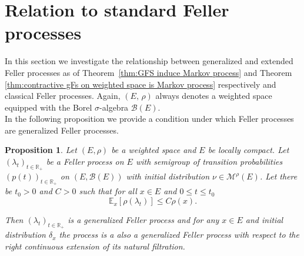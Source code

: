 \documentclass[a4paper,12pt]{article}
\newtheorem{proposition}[theorem]{Proposition}
\theoremstyle{definition}
\theoremstyle{remark}
\numberwithin{equation}{section}
\numberwithin{theorem}{section}
\begin{document}
\section{Relation to standard Feller processes}\label{sec:relation}

 In this section we investigate the relationship between generalized and extended Feller processes as of
Theorem~\ref{thm:GFS induce Markov process} and Theorem \ref{thm:contractive gFs on weighted space is Markov process} respectively and
classical Feller processes. Again, $\left(E,\,\rho\right)$ always denotes a weighted
space equipped with the Borel $\sigma$-algebra $\mathcal{B}(E)$. \\

In the following proposition we provide a condition under which Feller processes are generalized Feller processes. 
\begin{proposition}
\label{prop:Generalized Feller sometimes Feller process on locally compact space}
Let $\left(E,\rho\right)$ be a weighted space and $E$ be locally
compact. Let $\left(\lambda_{t}\right)_{t\in\mathbb{R}_{+}}$ be a
Feller process on $E$ with semigroup of transition probabilities
$\left(p(t)\right)_{t\in\mathbb{R}_{+}}$ on $\left(E,\mathcal{B}(E)\right)$
with initial distribution $\nu\in\mathcal{M}^{\rho}(E)$. Let there
be $t_{0}>0$ and $C>0$ such that for all $x\in E$ and $0\leq t\leq t_{0}$
\[
\mathbb{E}_{x}\left[\rho(\lambda_{t})\right]\leq C\rho(x).
\]

Then $\left(\lambda_{t}\right)_{t\in\mathbb{R}_{+}}$ is a generalized
Feller process and for any $x\in E$ and initial distribution $\delta_x$ the process is a also a generalized Feller process with respect to the right continuous extension of its natural filtration. 
\end{proposition}
\end{document}
